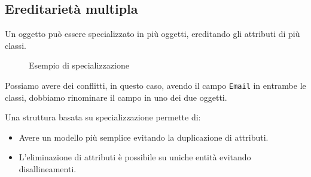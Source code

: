 \subsection{Ereditarietà multipla}
Un oggetto può essere specializzato in più oggetti, ereditando gli attributi
di più classi.
\begin{figure}[H]
    \centering
    \caption{Esempio di specializzazione}
\end{figure}
Possiamo avere dei conflitti, in questo caso, avendo il campo \texttt{Email} in entrambe
le classi, dobbiamo rinominare il campo in uno dei due oggetti.

\begin{tcolorbox}[colback=green!5!white,colframe=green!75!black, title=Benefici della specializzazione]
Una struttura basata su specializzazione permette di:
\begin{itemize}
    \item Avere un modello più semplice evitando la duplicazione di attributi.
    \item L'eliminazione di attributi è possibile su uniche entità evitando disallineamenti.
\end{itemize}
\end{tcolorbox}
